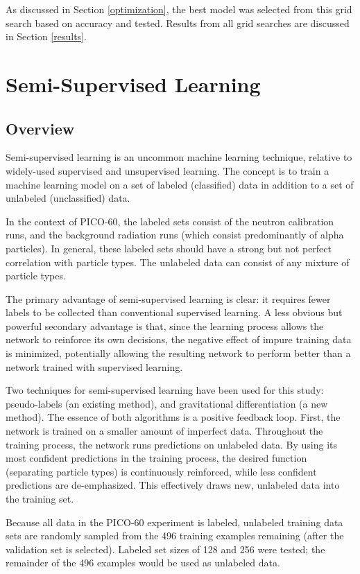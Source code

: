 \documentclass[10pt]{article}
\begin{document}
As discussed in Section \ref{optimization}, the best model was selected from this grid search based on accuracy and tested. Results from all grid searches are discussed in Section \ref{results}.

\section{Semi-Supervised Learning} \label{semi_supervised}

\subsection{Overview}

Semi-supervised learning is an uncommon machine learning technique, relative to widely-used supervised and unsupervised learning. The concept is to train a machine learning model on a set of labeled (classified) data in addition to a set of unlabeled (unclassified) data.

In the context of PICO-60, the labeled sets consist of the neutron calibration runs, and the background radiation runs (which consist predominantly of alpha particles). In general, these labeled sets should have a strong but not perfect correlation with particle types. The unlabeled data can consist of any mixture of particle types.

The primary advantage of semi-supervised learning is clear: it requires fewer labels to be collected than conventional supervised learning. A less obvious but powerful secondary advantage is that, since the learning process allows the network to reinforce its own decisions, the negative effect of impure training data is minimized, potentially allowing the resulting network to perform better than a network trained with supervised learning.

Two techniques for semi-supervised learning have been used for this study: pseudo-labels (an existing method), and gravitational differentiation (a new method). The essence of both algorithms is a positive feedback loop. First, the network is trained on a smaller amount of imperfect data. Throughout the training process, the network runs predictions on unlabeled data. By using its most confident predictions in the training process, the desired function (separating particle types) is continuously reinforced, while less confident predictions are de-emphasized. This effectively draws new, unlabeled data into the training set.

Because all data in the PICO-60 experiment is labeled, unlabeled training data sets are randomly sampled from the 496 training examples remaining (after the validation set is selected). Labeled set sizes of 128 and 256 were tested; the remainder of the 496 examples would be used as unlabeled data.
\end{document}
